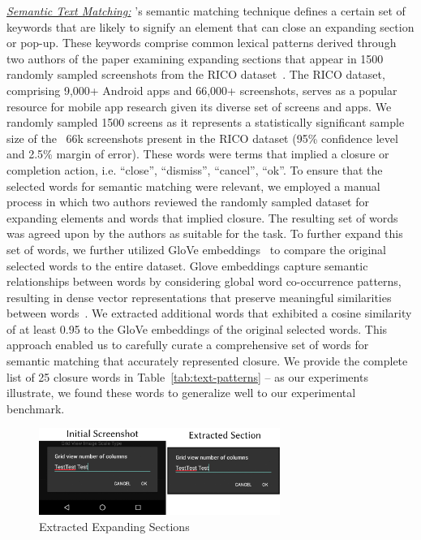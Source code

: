 \noindent\emph{\underline{Semantic Text Matching:}} \MotorEase's semantic matching technique defines a certain set of keywords that are likely to signify an element that can close an expanding section or pop-up.  
These keywords comprise common lexical patterns derived through two authors of the paper examining expanding sections that appear in 1500 randomly sampled screenshots from the RICO dataset~\cite{Deka:UIST'17}. The RICO dataset, comprising 9,000+ Android apps and 66,000+ screenshots, serves as a popular resource for mobile app research given its diverse set of screens and apps. We randomly sampled 1500 screens as it represents a statistically significant sample size of the ~66k screenshots present in the RICO dataset (95\% confidence level and 2.5\% margin of error). These words were terms that implied a closure or completion action, i.e. ``close'', ``dismiss'', ``cancel'', ``ok''. To ensure that the selected words for semantic matching were relevant, we employed a manual process in which two authors reviewed the randomly sampled dataset for expanding elements and words that implied closure. The resulting set of words was agreed upon by the authors as suitable for the task. To further expand this set of words, we further utilized GloVe embeddings~\cite{glove} to compare the original selected words to the entire dataset. Glove embeddings capture semantic relationships between words by considering global word co-occurrence patterns, resulting in dense vector representations that preserve meaningful similarities between words~\cite{glove}. We extracted additional words that exhibited a cosine similarity of at least 0.95 to the GloVe embeddings of the original selected words. This approach enabled us to carefully curate a comprehensive set of words for semantic matching that accurately represented closure. We provide the complete list of 25 closure words in Table~\ref{tab:text-patterns} -- as our experiments illustrate, we found these words to generalize well to our experimental benchmark. %

\begin{figure}[h]
    \centering
    \includegraphics[width=0.7\textwidth]{imgs/extracted-section.pdf}
    \caption{Extracted Expanding Sections}
    \label{extractedSec}
\end{figure}

